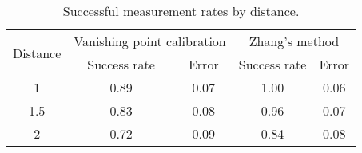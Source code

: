 \begin{table}
\centering
\begin{tabular}{@{} *5c @{}}
\toprule
\multirow{2}{*}{Distance} & \multicolumn{2}{c}{Vanishing point calibration} & \multicolumn{2}{c}{Zhang's method}\\ 
\cmidrule(r){2-3}
\cmidrule(r){4-5}
& Success rate & Error & Success rate & Error \\
\midrule
 1 		& 0.89 & 0.07 & 1.00 & 0.06 \\ 
 1.5  	& 0.83 & 0.08 & 0.96 & 0.07 \\
 2 		& 0.72 & 0.09 & 0.84 & 0.08 \\
\bottomrule
 \end{tabular}
 \caption{Successful measurement rates by distance.}
\label{table:key_measurement_by_distance}
\end{table}
